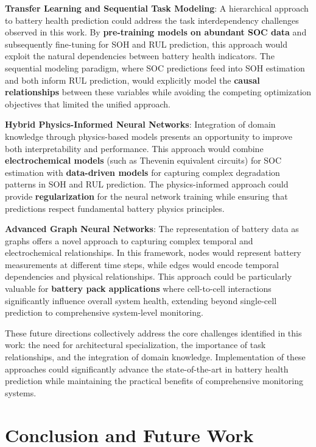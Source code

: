 \textbf{Transfer Learning and Sequential Task Modeling}: A hierarchical approach to battery health prediction could address the task interdependency challenges observed in this work. By \textbf{pre-training models on abundant SOC data} and subsequently fine-tuning for SOH and RUL prediction, this approach would exploit the natural dependencies between battery health indicators. The sequential modeling paradigm, where SOC predictions feed into SOH estimation and both inform RUL prediction, would explicitly model the \textbf{causal relationships} between these variables while avoiding the competing optimization objectives that limited the unified approach.

\textbf{Hybrid Physics-Informed Neural Networks}: Integration of domain knowledge through physics-based models presents an opportunity to improve both interpretability and performance. This approach would combine \textbf{electrochemical models} (such as Thevenin equivalent circuits) for SOC estimation with \textbf{data-driven models} for capturing complex degradation patterns in SOH and RUL prediction. The physics-informed approach could provide \textbf{regularization} for the neural network training while ensuring that predictions respect fundamental battery physics principles.

\textbf{Advanced Graph Neural Networks}: The representation of battery data as graphs offers a novel approach to capturing complex temporal and electrochemical relationships. In this framework, nodes would represent battery measurements at different time steps, while edges would encode temporal dependencies and physical relationships. This approach could be particularly valuable for \textbf{battery pack applications} where cell-to-cell interactions significantly influence overall system health, extending beyond single-cell prediction to comprehensive system-level monitoring.

These future directions collectively address the core challenges identified in this work: the need for architectural specialization, the importance of task relationships, and the integration of domain knowledge. Implementation of these approaches could significantly advance the state-of-the-art in battery health prediction while maintaining the practical benefits of comprehensive monitoring systems.

\chapter{Conclusion and Future Work}
\label{sec:conclusion_future_work}

